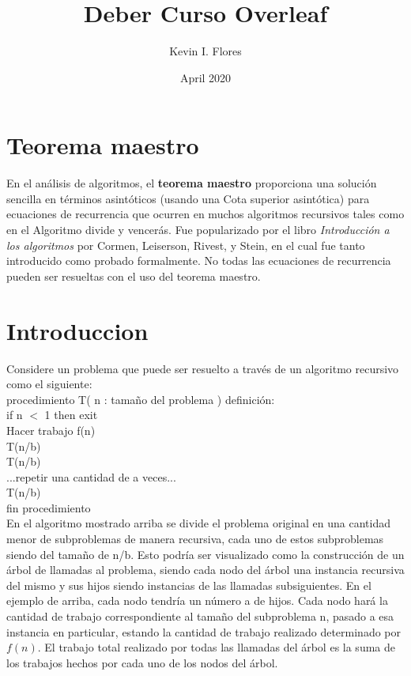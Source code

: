 \documentclass[12pt]{article}
\title{Deber Curso Overleaf}
\author{Kevin I. Flores}
\date{April 2020}
\begin{document}
\maketitle

\section*{Teorema maestro}
En el análisis de algoritmos, el \textbf{teorema maestro} proporciona una solución sencilla en términos asintóticos (usando una Cota superior asintótica) para ecuaciones de recurrencia que ocurren en muchos algoritmos recursivos tales como en el Algoritmo divide y vencerás. Fue popularizado por el libro \textit{Introducción a los algoritmos} por Cormen, Leiserson, Rivest, y Stein, en el cual fue tanto introducido como probado formalmente. No todas las ecuaciones de recurrencia pueden ser resueltas con el uso del teorema maestro.

\section*{Introduccion}
Considere un problema que puede ser resuelto a través de un algoritmo recursivo como el siguiente:\\
procedimiento T( n : tamaño del problema ) definición:\\
if n $<$ 1 then exit\\
Hacer trabajo f(n)\\
T(n/b)\\
T(n/b)\\
...repetir una cantidad de  a veces...\\
T(n/b)\\
fin procedimiento\\

En el algoritmo mostrado arriba se divide el problema original en una cantidad menor de subproblemas de manera recursiva, cada uno de estos subproblemas siendo del tamaño de n/b. Esto podría ser visualizado como la construcción de un árbol de llamadas al problema, siendo cada nodo del árbol una instancia recursiva del mismo y sus hijos siendo instancias de las llamadas subsiguientes. En el ejemplo de arriba, cada nodo tendría un número a de hijos. Cada nodo hará la cantidad de trabajo correspondiente al tamaño del subproblema n, pasado a esa instancia en particular, estando la cantidad de trabajo realizado determinado por $f(n)$. El trabajo total realizado por todas las llamadas del árbol es la suma de los trabajos hechos por cada uno de los nodos del árbol.\\
\end{document}
